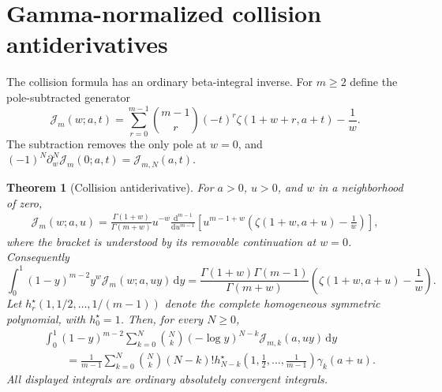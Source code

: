 \documentclass[11pt]{article}
\numberwithin{equation}{section}
\newtheorem{theorem}{Theorem}[section]
\theoremstyle{definition}\newtheorem{definition}[theorem]{Definition}
\theoremstyle{remark}\newtheorem{remark}[theorem]{Remark}
\newcommand{\dd}{\,\mathrm d}
\newcommand{\cJ}{\mathcal J}
\begin{document}
\section{Gamma-normalized collision antiderivatives}
The collision formula has an ordinary beta-integral inverse. For $m\ge2$ define the pole-subtracted generator
\begin{equation}\label{eq:Jgenerator}
 \cJ_m(w;a,t)=\sum_{r=0}^{m-1}\binom{m-1}{r}(-t)^r
                \zeta(1+w+r,a+t)-\frac1w.
\end{equation}
The subtraction removes the only pole at $w=0$, and
$(-1)^N\partial_w^N\cJ_m(0;a,t)=\cJ_{m,N}(a,t)$.

\begin{theorem}[Collision antiderivative]\label{thm:primitive}
For $a>0$, $u>0$, and $w$ in a neighborhood of zero,
\begin{align}\label{eq:Gammaoperator}
 \cJ_m(w;a,u)
 =\frac{\Gamma(1+w)}{\Gamma(m+w)}u^{-w}
 \frac{\mathrm d^{m-1}}{\mathrm du^{m-1}}
 \left[u^{m-1+w}\left(\zeta(1+w,a+u)-\frac1w\right)\right],
\end{align}
where the bracket is understood by its removable continuation at $w=0$. Consequently
\begin{equation}\label{eq:betaprimit}
 \int_0^1(1-y)^{m-2}y^w\cJ_m(w;a,uy)\dd y
 =\frac{\Gamma(1+w)\Gamma(m-1)}{\Gamma(m+w)}
      \left(\zeta(1+w,a+u)-\frac1w\right).
\end{equation}
Let $h_r^\star(1,1/2,\ldots,1/(m-1))$ denote the complete homogeneous symmetric polynomial, with $h_0^\star=1$. Then, for every $N\ge0$,
\begin{align}\label{eq:allprimitive}
 &\int_0^1(1-y)^{m-2}
 \sum_{k=0}^N\binom Nk(-\log y)^{N-k}\cJ_{m,k}(a,uy)\dd y\\
 &\qquad=\frac1{m-1}\sum_{k=0}^N\binom Nk(N-k)!
 h_{N-k}^\star\left(1,\frac12,\ldots,\frac1{m-1}\right)
 \gamma_k(a+u).\nonumber
\end{align}
All displayed integrals are ordinary absolutely convergent integrals.
\end{theorem}
\end{document}
